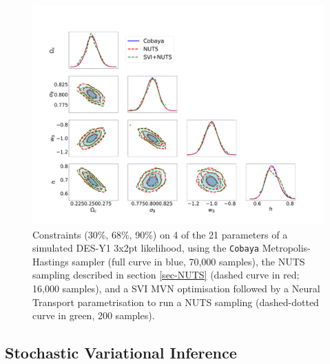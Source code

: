 \documentclass[twocolumn,twocolappendix,nofootinbib,iop]{openjournal}
\newcommand{\JZ}[1]{{\color{purple}JZ: #1}}
\begin{document}

%
\begin{figure}
\centering
\includegraphics[width=1.5\columnwidth]{figures/fig_Cobaya-NUTS-SVI200_v1.pdf}
\caption{Constraints (30\%, 68\%, 90\%) on 4 of the 21 parameters of a simulated DES-Y1 3x2pt likelihood, using the \texttt{Cobaya} Metropolis-Hastings sampler (full curve in blue, 70,000 samples), the  NUTS sampling described in section \ref{sec-NUTS} (dashed curve in red; 16,000 samples), and a SVI MVN optimisation followed by a Neural Transport parametrisation to run a NUTS sampling (dashed-dotted curve in green, 200 samples).}
\label{fig_cobaya_NUTS_SVI}
\end{figure}



\subsection{Stochastic Variational Inference}
\label{sec-SVI}
%
\end{document}
